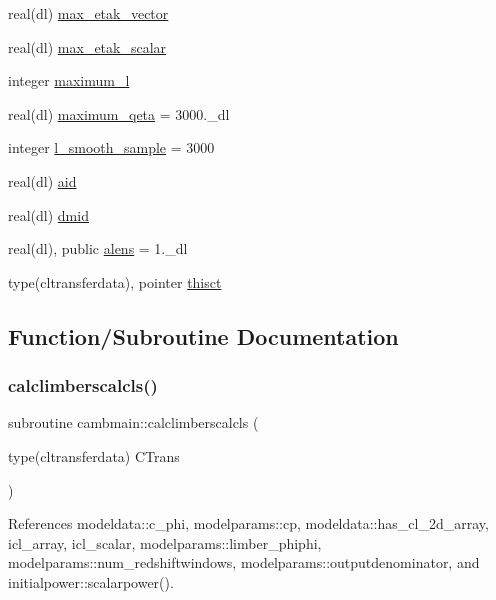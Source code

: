 \begin{DoxyCompactItemize}
\item 
real(dl) \mbox{\hyperlink{namespacecambmain_a070e24f1ae1246e4d6b1ad8aacc87919}{max\+\_\+etak\+\_\+vector}}
\item 
real(dl) \mbox{\hyperlink{namespacecambmain_ac4c24515e982e0af0ef3997027302e04}{max\+\_\+etak\+\_\+scalar}}
\item 
integer \mbox{\hyperlink{namespacecambmain_acb0277d55c225aee4dcfca123a3631a2}{maximum\+\_\+l}}
\item 
real(dl) \mbox{\hyperlink{namespacecambmain_a538fac0cbeacb9f2daa7bd638e3ca806}{maximum\+\_\+qeta}} = 3000.\+\_\+dl
\item 
integer \mbox{\hyperlink{namespacecambmain_a3ebcb0843a6249a58a33f83e5cf9b73b}{l\+\_\+smooth\+\_\+sample}} = 3000
\item 
real(dl) \mbox{\hyperlink{namespacecambmain_a75e3aaa48b8fb5985062a5be2f05dea8}{aid}}
\item 
real(dl) \mbox{\hyperlink{namespacecambmain_a926ceb33a98900b90f263443b550e391}{dmid}}
\item 
real(dl), public \mbox{\hyperlink{namespacecambmain_a5e84a7f00ba906908259607d54f9176f}{alens}} = 1.\+\_\+dl
\item 
type(cltransferdata), pointer \mbox{\hyperlink{namespacecambmain_a48fb88bbacefa24534f688f9de4ff827}{thisct}}
\end{DoxyCompactItemize}


\subsection{Function/\+Subroutine Documentation}
\mbox{\label{namespacecambmain_ad3f7f4af84395bc4648bcc82e81e8861}} 
\subsubsection{\texorpdfstring{calclimberscalcls()}{calclimberscalcls()}}
{\footnotesize\ttfamily subroutine cambmain\+::calclimberscalcls (\begin{DoxyParamCaption}\item[{type(cltransferdata)}]{C\+Trans }\end{DoxyParamCaption})\hspace{0.3cm}{\ttfamily [private]}}



References modeldata\+::c\+\_\+phi, modelparams\+::cp, modeldata\+::has\+\_\+cl\+\_\+2d\+\_\+array, icl\+\_\+array, icl\+\_\+scalar, modelparams\+::limber\+\_\+phiphi, modelparams\+::num\+\_\+redshiftwindows, modelparams\+::outputdenominator, and initialpower\+::scalarpower().



